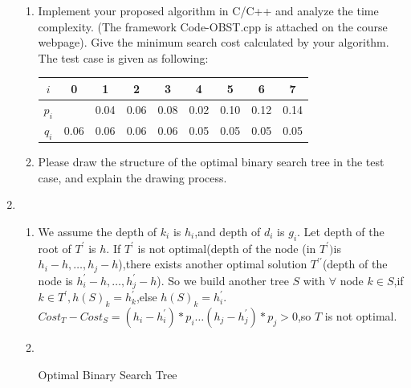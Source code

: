 \documentclass[12pt,a4paper]{article}
\makeatletter
\newtheorem*{solution}{Solution}
\theoremstyle{definition}
\renewenvironment{solution}[1][Solution] {\par\pushQED{\qed}\normalfont\topsep6\p@\@plus6\p@\relax\trivlist\item[\hskip\labelsep\bfseries#1\@addpunct{.}]\ignorespaces}{\popQED\endtrivlist\@endpefalse} \makeatother
\makeatother
\begin{document}
\begin{enumerate}
\begin{enumerate}
			\item Implement your proposed algorithm in C/C++ and analyze the time complexity. ({\color{blue}The framework Code-OBST.cpp is attached on the course webpage}). Give the minimum search cost calculated by your algorithm. The test case is given as following:
			\begin{table}[H]
				\setlength{\abovecaptionskip}{0cm}
				\setlength{\belowcaptionskip}{0.1cm}
				\centering		
				\begin{tabular}{|c|cccccccc|}
					\hline
					$ i $&0&1&2&3&4&5&6&7\\
					\hline
					$ p_{i} $&&0.04&0.06&0.08&0.02&0.10&0.12&0.14\\
					\hline
					$ q_{i} $&0.06&0.06&0.06&0.06&0.05&0.05&0.05&0.05\\
					\hline
				\end{tabular}
			\end{table}
			\item Please draw the structure of the optimal binary search tree in the test case, and explain the drawing process.   
		\end{enumerate}
		    \begin{solution}
		    ~\par
		       \begin{enumerate}
		           \item We assume the depth of $k_i$ is $h_i$,and depth of $d_i$ is $g_i$. Let depth of the root of $T^{\prime}$ is $h$. If $T^{\prime}$ is not optimal(depth of the node (in $T^\prime) $is $h_{i}-h, \ldots, h_{j}-h$),there exists another optimal solution $T^{\prime\prime}$(depth of the node is $h_{i}^{\prime}-h, \ldots, h_{j}^{\prime}-h$). So we build another tree $S$ with $\forall$ node $k\in S$,if $k\in T^\prime,h(S)_k=h_{k}^{\prime}$,else $h(S)_k=h_{i}^\prime$.\\
		           $ Cost_T-Cost_S=(h_{i}-h_{i}^{\prime})*p_i\ldots(h_{j}-h_{j}^{\prime})*p_j>0$,so $T$ is not optimal.
		           \item~\par
		           \begin{algorithm}[H]
        		 \BlankLine
        \caption{Optimal Binary Search Tree}
        \label{algorithm}

\end{algorithm}
\end{enumerate}
\end{solution}
\end{enumerate}
\end{document}
